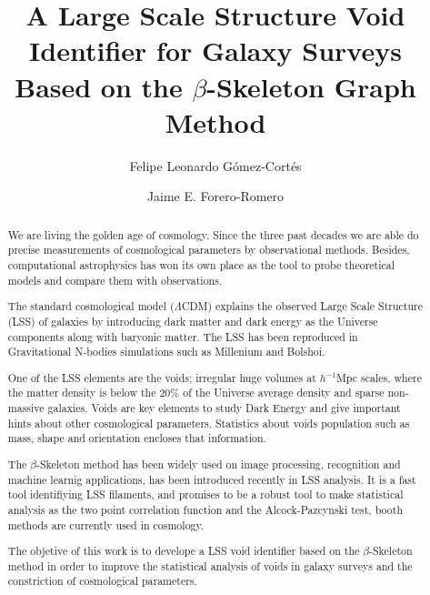 \documentclass[manuscript]{aastex62}
\begin{document}
\title{A Large Scale Structure Void Identifier for Galaxy Surveys
  Based on the $\beta$-Skeleton Graph Method}


\author{Felipe Leonardo G\'omez-Cort\'es}

\nocollaboration


\author{Jaime E. Forero-Romero}


\begin{abstract}

  We are living the golden age of cosmology. Since the three past decades
  we are able do precise measurements of cosmological parameters by
  observational methods. Besides, computational astrophysics has
  won its own place as the tool to probe theoretical models and compare
  them with observations.

  The standard cosmological model ($\Lambda$CDM) explains the observed
  Large Scale Structure (LSS) of galaxies by introducing dark matter and
  dark energy as the Universe components along with baryonic matter.
  The LSS has been reproduced in Gravitational N-bodies simulations
  such as Millenium and Bolshoi.

  One of the LSS elements are the voids; irregular huge volumes at $h^{-1}$Mpc
  scales, where the matter density is below the $20\%$ of the Universe
  average density and sparse non-massive galaxies. Voids are key
  elements to study Dark Energy and give important hints about other
  cosmological parameters. Statistics about voids population such as
  mass, shape and orientation encloses that information.

  The $\beta$-Skeleton method has been widely used on image processing,
  recognition and machine learnig applications, has been introduced
  recently in LSS analysis. It is a fast tool identifiying LSS filaments,
  and promises to be a robust tool to make statistical analysis
  as the two point correlation function and the Alcock-Pazcynski test,
  booth methods are currently used in cosmology.

  The objetive of this work is to develope a LSS void identifier based
  on the $\beta$-Skeleton method in order to improve the statistical
  analysis of voids in galaxy surveys and the constriction of
  cosmological parameters.


  
\end{abstract}
\end{document}

